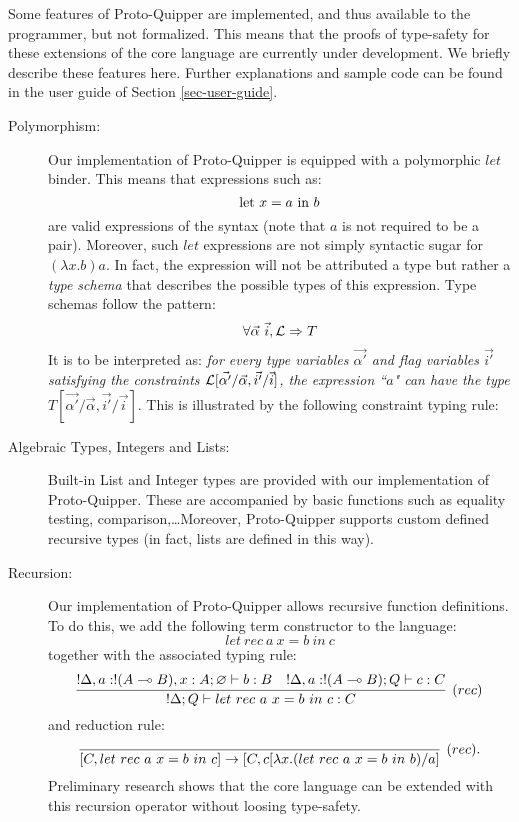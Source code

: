 \documentclass[twoside]{article}
\begin{document}
Some features of Proto-Quipper are implemented, and thus available 
to the programmer, but not formalized. This means that the proofs 
of type-safety for these extensions of the core language are 
currently under development. We briefly describe these features 
here. Further explanations and sample code can be found in the 
user guide of Section \ref{sec-user-guide}.
\begin{description}
  \item[Polymorphism:] Our implementation of Proto-Quipper is 
    equipped with a polymorphic $let$ binder. This means that 
    expressions such as:
    \[
    \text{let}~ x = a ~\text{in}~ b
    \]
    are valid expressions of the syntax (note that $a$ is not required 
    to be a pair). Moreover, such $let$ expressions are not simply 
    syntactic sugar for $(\lambda x.b)a$. In fact, the expression
    will not be attributed a type but rather a \emph{type schema} that
    describes the possible types of this expression.
    Type schemas follow the pattern:
    	$$\forall \vec{\alpha}~ \vec{i}, \mathcal{L} \Rightarrow T$$
    It is to be interpreted as: \textit{for every type variables $\vec{\alpha'}$ and flag variables $\vec{i'}$ satisfying
    the constraints $\mathcal{L}[\vec{\alpha'} / \vec{\alpha}, \vec{i'}/ \vec{i}]$, the expression
    ``$a$" can have the type $T[\vec{\alpha'} / \vec{\alpha}, \vec{i'}/ \vec{i}]$}.
		This is illustrated by the following constraint typing rule:
			\begin{prooftree}
				 \noLine
			\end{prooftree}
  \item[Algebraic Types, Integers and Lists:] Built-in List and 
    Integer types are provided with our implementation of Proto-Quipper.
    These are accompanied by basic functions such as equality testing, 
    comparison,\ldots Moreover, Proto-Quipper supports custom defined
    recursive types (in fact, lists are defined in this way).
  \item[Recursion:] Our implementation of Proto-Quipper allows 
    recursive function definitions. To do this, we add the following 
    term constructor to the language:
    \[
    let~rec~ a ~x = b~ in~ c
    \]    
    together with the associated typing rule:
    \[
    \infer[(rec)]{!\Delta;Q \entails let~rec~ a ~x = b~ in~ c:C}{
      !\Delta,a:!(A\loli B), x:A;\varnothing \entails b:B
      &
      !\Delta, a:!(A\loli B) ;Q \entails c:C      
    }
    \]
    and reduction rule:
    \[
    \infer[(rec).]{[C,let~rec~ a ~x = b~ in~ c]\to [C, c[\lambda x.(let~rec~ a ~x = b~ in~ b)/a]}{}
    \]
    Preliminary research shows that the core language can be extended 
    with this recursion operator without loosing type-safety. 
\end{description}
\end{document}
